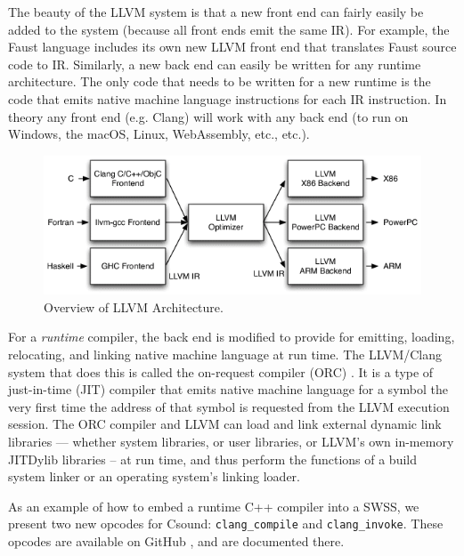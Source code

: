\documentclass[letterpaper, 12pt]{article}
\begin{document}
\noindent The beauty of the LLVM system is that a new front end can fairly easily be added to the system (because all front ends emit the same IR). For example, the Faust language \citep{faustdsp} includes its own new LLVM front end that translates Faust source code to IR. Similarly, a new back end can easily be written for any runtime architecture. The only code that needs to be written for a new runtime is the code that emits native machine language instructions for each IR instruction. In theory any front end (e.g. Clang) will work with any back end (to run on Windows, the macOS, Linux, WebAssembly, etc., etc.).

\begin{figure}[]
\begin{center}
\includegraphics{llvm}
\caption{Overview of LLVM Architecture.}
\label{fig:llvm}
\end{center}
\end{figure}

For a \textit{runtime} compiler, the back end is modified to provide for emitting, loading, relocating, and linking native machine language at run time. The LLVM/Clang system that does this is called the on-request compiler (ORC) \citep{llvmorc}. It is a type of just-in-time (JIT) compiler that emits native machine language for a symbol the very first time  the address of that symbol is requested from the LLVM execution session. The ORC compiler and LLVM can load and link external dynamic link libraries --- whether system libraries, or user libraries, or LLVM's own in-memory JITDylib libraries -- at run time, and thus perform the functions of a build system linker or an operating system's linking loader.


As an example of how to embed a runtime C++ compiler into a SWSS, we present two new opcodes for Csound: \texttt{clang\_compile} and \texttt{clang\_invoke}. These opcodes are available on GitHub \cite{clangopcodes}, and are documented there. 
\end{document}
